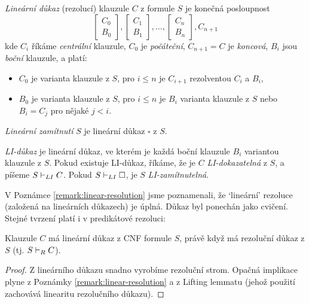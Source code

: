 \begin{definition}
    \emph{Lineární důkaz} (rezolucí) klauzule $C$ z formule $S$ je konečná posloupnost
    $$
    \begin{bmatrix}
        C_0 \\
        B_0
    \end{bmatrix},
    \begin{bmatrix}
        C_1 \\
        B_1
    \end{bmatrix},\dots,
    \begin{bmatrix}
        C_n \\
        B_n
    \end{bmatrix},
    C_{n+1}
    $$
    kde $C_i$ říkáme \emph{centrální} klauzule, $C_0$ je \emph{počáteční}, $C_{n+1}=C$ je \emph{koncová}, $B_i$ jsou \emph{boční} klauzule, a platí:
    \begin{itemize}
        \item $C_0$ je varianta klauzule z $S$, pro $i\leq n$ je $C_{i+1}$ rezolventou $C_i$ a $B_i$,
        \item $B_0$ je varianta klauzule z $S$, pro $i\leq n$ je $B_i$ varianta klauzule z $S$ nebo $B_i=C_j$ pro nějaké $j<i$. 
    \end{itemize}
    \emph{Lineární zamítnutí} $S$ je lineární důkaz $\square$ z $S$.
    
    \emph{LI-důkaz} je lineární důkaz, ve kterém je každá boční klauzule $B_i$ variantou klauzule z $S$. Pokud existuje LI-důkaz, říkáme, že je $C$ \emph{LI-dokazatelná} z $S$, a píšeme $S\vdash_{LI}C$. Pokud $S\vdash_{LI}\square$, je $S$ \emph{LI-zamítnutelná}.
\end{definition}

V Poznámce \ref{remark:linear-resolution} jsme poznamenali, že `lineární' rezoluce (založená na lineárních důkazech) je úplná. Důkaz byl ponechán jako cvičení. Stejné tvrzení platí i v predikátové rezoluci:

\begin{theorem}
Klauzule $C$ má lineární důkaz z CNF formule $S$, právě když má rezoluční důkaz z $S$ (tj. $S\vdash_R C$).
\end{theorem}
\begin{proof}
Z lineárního důkazu snadno vyrobíme rezoluční strom. Opačná implikace plyne z Poznámky \ref{remark:linear-resolution} a z Lifting lemmatu (jehož použití zachovává linearitu rezolučního důkazu).
\end{proof}

